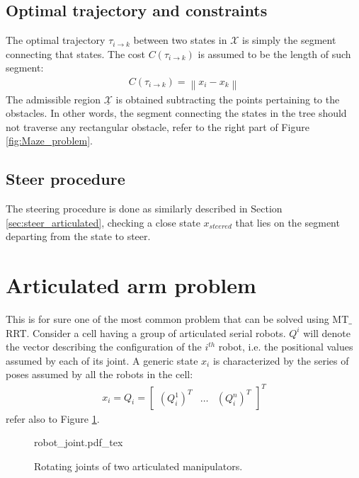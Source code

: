 \subsection{Optimal trajectory and constraints}
\label{sec:traj_maze}

The optimal trajectory $\tau_{i \rightarrow k}$ between two states in $\mathcal{X}$ is simply the segment connecting that states. 
The cost $C(\tau_{i \rightarrow k})$ is assumed to be the length of such segment:
\begin{eqnarray}
C(\tau_{i \rightarrow k}) = \left \| x_i - x_k \right \|
\end{eqnarray}
The admissible region $\underline{\mathcal{X}}$ is obtained subtracting the points pertaining to the obstacles. In other words, the segment connecting the states in the tree should not traverse any rectangular obstacle, refer to the right part of Figure \ref{fig:Maze_problem}.

\subsection{Steer procedure}

The steering procedure is done as similarly described in Section \ref{sec:steer_articulated}, checking a close state $x_{steered}$ that lies on the segment departing from the state to steer.

\section{Articulated arm problem}

This is for sure one of the most common problem that can be solved using MT$\_$RRT. Consider a cell having a group of articulated serial robots.
$Q^{i}$ will denote the vector describing the configuration of the $i^{th}$ robot, i.e. the positional values assumed by each of its joint.
A generic state $x_i$ is characterized by the series of poses assumed by all the robots in the cell:
\begin{eqnarray}
x_i = Q_i = \begin{bmatrix} (Q^1_i)^T & \hdots & (Q^n_i)^T \end{bmatrix}^T
\end{eqnarray}
refer also to Figure \ref{fig:q_example}.

 \begin{figure}
	 \centering
 \def\svgwidth{0.8 \columnwidth}
 {robot_joint.pdf_tex} 
	 \caption{Rotating joints of two articulated manipulators.}
 \label{fig:q_example}
 \end{figure}

